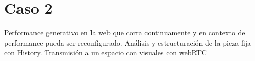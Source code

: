 \section{Caso 2}


Performance generativo en la web que corra continuamente y en contexto de performance pueda ser reconfigurado.
Análisis y estructuración de la pieza fija con History. Transmisión a un espacio con visuales con webRTC 
